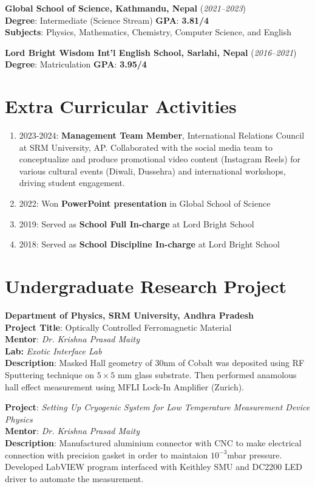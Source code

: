 \documentclass[a4paper,10pt]{article}
\begin{document}
\textbf{Global School of Science, Kathmandu, Nepal} (\textit{2021–2023}) \\
\textbf{Degree}: Intermediate (Science Stream) \hfill \textbf{GPA}: \textbf{3.81/4}\\
\textbf{Subjects}: Physics, Mathematics, Chemistry, Computer Science, and English

\textbf{Lord Bright Wisdom Int’l English School, Sarlahi, Nepal} (\textit{2016–2021}) \\
\textbf{Degree}: Matriculation \hfill  \textbf{GPA}: \textbf{3.95/4}

\section*{Extra Curricular Activities}
\begin{enumerate}
    \item 2023-2024: \textbf{Management Team Member}, International Relations Council at SRM University, AP. Collaborated with the social media team to conceptualize and produce promotional video content (Instagram Reels) for various cultural events (Diwali, Dussehra) and international workshops, driving student engagement.
    \item 2022: Won \textbf{PowerPoint presentation} in Global School of Science
    \item 2019: Served as \textbf{School Full In-charge} at Lord Bright School
    \item 2018: Served as \textbf{School Discipline In-charge} at Lord Bright School
\end{enumerate}


\section*{Undergraduate Research Project}
\textbf{Department of Physics, SRM University, Andhra Pradesh} \\
\textbf{Project Title}: Optically Controlled Ferromagnetic Material\\
\textbf{Mentor}:\textit{ Dr. Krishna Prasad Maity} \\
\textbf{Lab:}\textit{ Exotic Interface Lab}\\
\textbf{Description}: Masked Hall geometry of 30nm of Cobalt was deposited using RF Sputtering technique on $5 \times 5$ mm glass substrate. Then performed anamolous hall effect measurement using MFLI Lock-In Amplifier (Zurich).

\textbf{Project}: \textit{Setting Up Cryogenic System for Low Temperature Measurement Device Physics}\\
\textbf{Mentor}: \textit{Dr. Krishna Prasad Maity}\\
\textbf{Description}: Manufactured aluminium connector with CNC to make electrical connection with precision gasket in order to maintaion $10^{-3}$mbar pressure. Developed LabVIEW program interfaced with Keithley SMU and DC2200 LED driver to automate the measurement.
\end{document}
